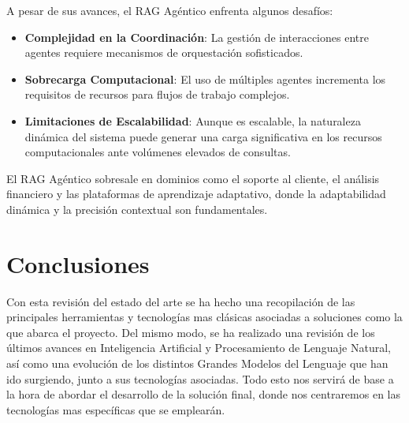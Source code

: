 A pesar de sus avances, el RAG Agéntico enfrenta algunos desafíos:
\begin{itemize}
    \item \textbf{Complejidad en la Coordinación}: La gestión de interacciones entre agentes requiere mecanismos de orquestación sofisticados.
    \item \textbf{Sobrecarga Computacional}: El uso de múltiples agentes incrementa los requisitos de recursos para flujos de trabajo complejos.
    \item \textbf{Limitaciones de Escalabilidad}: Aunque es escalable, la naturaleza dinámica del sistema puede generar una carga significativa en los recursos computacionales ante volúmenes elevados de consultas.
\end{itemize}

El RAG Agéntico sobresale en dominios como el soporte al cliente, el análisis financiero y las plataformas de aprendizaje adaptativo, donde la adaptabilidad dinámica y la precisión contextual son fundamentales.


\section{Conclusiones}

Con esta revisión del estado del arte se ha hecho una recopilación de las principales herramientas y tecnologías mas clásicas asociadas a soluciones como la que abarca el proyecto.
Del mismo modo, se ha realizado una revisión de los últimos avances en Inteligencia Artificial y Procesamiento de Lenguaje Natural, así como una evolución de los distintos Grandes Modelos del Lenguaje que han ido surgiendo, junto a sus tecnologías asociadas.
Todo esto nos servirá de base a la hora de abordar el desarrollo de la solución final, donde nos centraremos en las tecnologías mas específicas que se emplearán.
